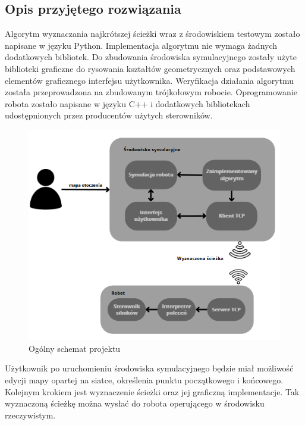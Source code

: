 \subsection{Opis przyjętego rozwiązania}
Algorytm wyznaczania najkrótszej ścieżki wraz z środowiskiem testowym zostało napisane w języku Python.
Implementacja algorytmu nie wymaga żadnych dodatkowych bibliotek. Do zbudowania środowiska symulacyjnego 
zostały użyte biblioteki graficzne do rysowania kształtów geometrycznych oraz podstawowych elementów graficznego 
interfejsu użytkownika. 
Weryfikacja działania algorytmu  została przeprowadzona na zbudowanym trójkołowym robocie.
Oprogramowanie robota zostało napisane w języku C++ i dodatkowych bibliotekach udostępnionych przez producentów użytych sterowników.

\begin{figure}[H]
	\centering
	\includegraphics[width=14cm]{pages/literatura/zdjecia/schematOgolny.png}
	\caption{Ogólny schemat projektu}
	\label{fig:Rysunek}
\end{figure}

Użytkownik po uruchomieniu środowiska symulacyjnego będzie miał możliwość edycji mapy opartej na siatce, określenia punktu początkowego i końcowego.
Kolejnym krokiem jest wyznaczenie ścieżki oraz jej graficzną implementacje. Tak wyznaczoną ścieżkę można wysłać do robota 
operującego w środowisku rzeczywistym. 

